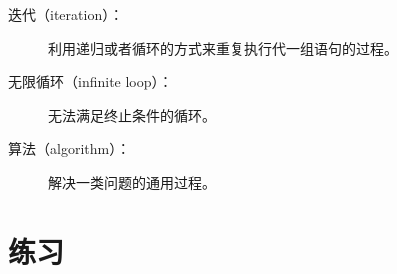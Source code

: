 \begin{description}

\item[迭代（iteration）：] 利用递归或者循环的方式来重复执行代一组语句的过程。


\item[无限循环（infinite loop）：] 无法满足终止条件的循环。


\item[算法（algorithm）：] 解决一类问题的通用过程。

\end{description}

\section{练习}

